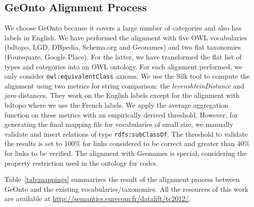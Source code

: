 \documentclass[a4paper,11pt]{report}
\begin{document}
\subsection{GeOnto Alignment Process}
 We choose GeOnto because it covers a large number of categories and also has labels in English. We have performed the alignment with five OWL vocabularies (bdtopo, LGD, DBpedia, Schema.org and Geonames) and two flat taxonomies (Foursquare, Google Place). For the latter, we have transformed the flat list of types and categories into an OWL ontology. For each alignment performed, we only consider \texttt{owl:equivalentClass} axioms. We use the Silk tool \cite{Julius09} to compute the alignment using two metrics for string comparison: the \textit{levenshteinDistance} and \textit{jaro} distances. They work on the English labels except for the alignment with bdtopo where we use the French labels. We apply the average aggregation function on these metrics with an empirically derived threshold. However, for generating the final mapping file for vocabularies of small size, we manually validate and insert relations of type \texttt{rdfs:subClassOf}. The threshold to validate the results is set to $100$\% for links considered to be correct and greater than $40$\% for links to be verified. The alignment with Geonames is special, considering the property restriction used in the ontology for codes.

Table~\ref{tab:mappings} summarizes the result of the alignment process between GeOnto and the existing vocabularies/taxonomies. All the resources of this work are available at \url{http://semantics.eurecom.fr/datalift/tc2012/}.
\begin{table}
\end{table}
\end{document}

